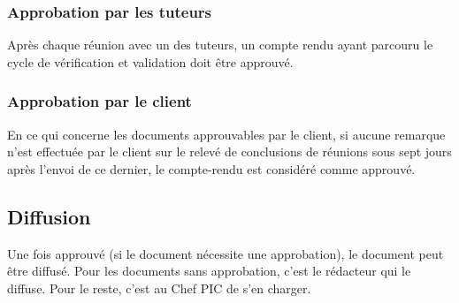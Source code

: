 \subsubsection*{Approbation par les tuteurs}
Après chaque réunion avec un des tuteurs, un compte rendu ayant parcouru le cycle de
vérification et validation doit être approuvé.


\subsubsection*{Approbation par le client}
En ce qui concerne les documents approuvables par le client, si aucune remarque n'est effectuée
par le client sur le relevé de conclusions de réunions sous sept jours après l'envoi de ce dernier,
le compte-rendu est considéré comme approuvé.

\subsection{Diffusion}
\label{Diffusion}

Une fois approuvé (si le document nécessite une approbation), le document peut être diffusé.
Pour les documents sans approbation, c'est le rédacteur qui le diffuse. Pour le reste, c'est au
Chef PIC de s'en charger.
